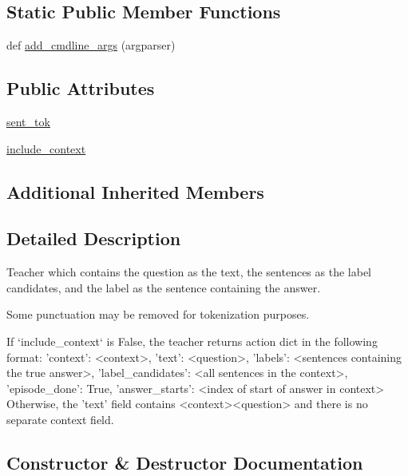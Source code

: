 \subsection*{Static Public Member Functions}
\begin{DoxyCompactItemize}
\item 
def \hyperlink{classparlai_1_1tasks_1_1squad_1_1agents_1_1FulldocsentenceTeacher_af4fae24533376a66d54c771b6c8d06b7}{add\+\_\+cmdline\+\_\+args} (argparser)
\end{DoxyCompactItemize}
\subsection*{Public Attributes}
\begin{DoxyCompactItemize}
\item 
\hyperlink{classparlai_1_1tasks_1_1squad_1_1agents_1_1FulldocsentenceTeacher_a3ad4365c2ebc8896e90e8b478eeb68ed}{sent\+\_\+tok}
\item 
\hyperlink{classparlai_1_1tasks_1_1squad_1_1agents_1_1FulldocsentenceTeacher_a1861bd0d07fa2488073e0292513187dc}{include\+\_\+context}
\end{DoxyCompactItemize}
\subsection*{Additional Inherited Members}


\subsection{Detailed Description}
\begin{DoxyVerb}Teacher which contains the question as the text, the sentences as the label
candidates, and the label as the sentence containing the answer.

Some punctuation may be removed for tokenization purposes.

If `include_context` is False, the teacher returns action dict in the
following format:
{
    'context': <context>,
    'text': <question>,
    'labels': <sentences containing the true answer>,
    'label_candidates': <all sentences in the context>,
    'episode_done': True,
    'answer_starts': <index of start of answer in context>
}
Otherwise, the 'text' field contains <context>\n<question> and there is
no separate context field.
\end{DoxyVerb}
 

\subsection{Constructor \& Destructor Documentation}
\mbox{\label{classparlai_1_1tasks_1_1squad_1_1agents_1_1FulldocsentenceTeacher_a0d38880d3b8ab12f4af6b95a5aa5e57f}} 
